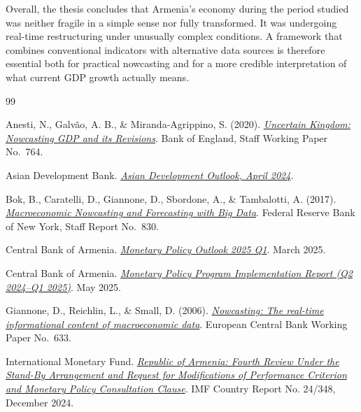 \documentclass[12pt,a4paper]{report}
\begin{document}
Overall, the thesis concludes that Armenia's economy during the period studied was neither fragile in a simple sense nor fully transformed. It was undergoing real-time restructuring under unusually complex conditions. A framework that combines conventional indicators with alternative data sources is therefore essential both for practical nowcasting and for a more credible interpretation of what current GDP growth actually means.

\renewcommand{\bibname}{References}
\cleardoublepage
{}
{}
\begin{thebibliography}{99}

Anesti, N., Galv\~{a}o, A. B., \& Miranda-Agrippino, S. (2020).
\href{https://www.bankofengland.co.uk/-/media/boe/files/working-paper/2018/uncertain-kingdom-nowcasting-gdp-and-its-revisions.pdf}{\textit{Uncertain Kingdom: Nowcasting GDP and its Revisions}}.
Bank of England, Staff Working Paper No.\ 764.

Asian Development Bank.
\href{https://www.adb.org/sites/default/files/publication/957856/asian-development-outlook-april-2024.pdf}{\textit{Asian Development Outlook, April 2024}}.

Bok, B., Caratelli, D., Giannone, D., Sbordone, A., \& Tambalotti, A. (2017).
\href{https://www.newyorkfed.org/medialibrary/media/research/staff_reports/sr830.pdf}{\textit{Macroeconomic Nowcasting and Forecasting with Big Data}}.
Federal Reserve Bank of New York, Staff Report No.\ 830.

Central Bank of Armenia.
\href{https://www.cba.am/file_manager/Inflation-reports./MPR_2025Q1_Eng.pdf}{\textit{Monetary Policy Outlook 2025 Q1}}.
March 2025.

Central Bank of Armenia.
\href{https://www.cba.am/en/reports/8463}{\textit{Monetary Policy Program Implementation Report (Q2 2024--Q1 2025)}}.
May 2025.

Giannone, D., Reichlin, L., \& Small, D. (2006).
\href{https://www.ecb.europa.eu/pub/pdf/scpwps/ecbwp633.pdf}{\textit{Nowcasting: The real-time informational content of macroeconomic data}}.
European Central Bank Working Paper No.\ 633.

International Monetary Fund.
\href{https://www.imf.org/en/Publications/CR/Issues/2024/12/17/Republic-of-Armenia-Fourth-Review-Under-the-Stand-By-Arrangement-and-Request-for-559673}{\textit{Republic of Armenia: Fourth Review Under the Stand-By Arrangement and Request for Modifications of Performance Criterion and Monetary Policy Consultation Clause}}.
IMF Country Report No. 24/348, December 2024.


\end{thebibliography}
\end{document}
